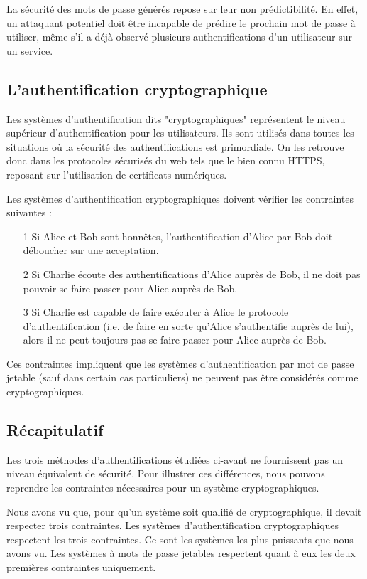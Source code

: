 	La sécurité des mots de passe générés repose sur leur non prédictibilité.
	En effet, un attaquant potentiel doit être incapable de prédire le
	prochain mot de passe à utiliser, même s'il a déjà observé plusieurs
	authentifications d'un utilisateur sur un service.

\subsection{L'authentification cryptographique}

	Les systèmes d'authentification dits "cryptographiques" représentent le
	niveau supérieur d'authentification pour les utilisateurs. Ils sont
	utilisés dans toutes les situations où la sécurité des authentifications
	est primordiale. On les retrouve donc dans les protocoles sécurisés du web
	tels que le bien connu HTTPS, reposant sur l'utilisation de certificats
	numériques.

	Les systèmes d'authentification cryptographiques doivent vérifier les
	contraintes suivantes \cite{Auth} :
	\begin{itemize}
	  \item[1] Si Alice et Bob sont honnêtes, l'authentification d'Alice par
	  Bob doit déboucher sur une acceptation.
	  \item[2] Si Charlie écoute des authentifications d'Alice auprès de Bob,
	  il ne doit pas pouvoir se faire passer pour Alice auprès de Bob.
	  \item[3] Si Charlie est capable de faire exécuter à Alice le protocole
	  d'authentification (i.e. de faire en sorte qu'Alice s'authentifie auprès
	  de lui), alors il ne peut toujours pas se faire passer pour Alice auprès
	  de Bob.
	\end{itemize}

  Ces contraintes impliquent que les systèmes d'authentification par mot de
  passe jetable (sauf dans certain cas particuliers) ne peuvent pas être
  considérés comme cryptographiques.

\subsection{Récapitulatif}

	Les trois méthodes d'authentifications étudiées ci-avant ne fournissent
	pas un niveau équivalent de sécurité. Pour illustrer ces différences, nous
	pouvons reprendre les contraintes nécessaires pour un système
	cryptographiques.

	Nous avons vu que, pour qu'un système soit qualifié de cryptographique, il
	devait respecter trois contraintes. Les systèmes d'authentification
	cryptographiques respectent les trois contraintes. Ce sont les systèmes
	les plus puissants que nous avons vu. Les systèmes à mots de passe
	jetables respectent quant à eux les deux premières contraintes uniquement.


